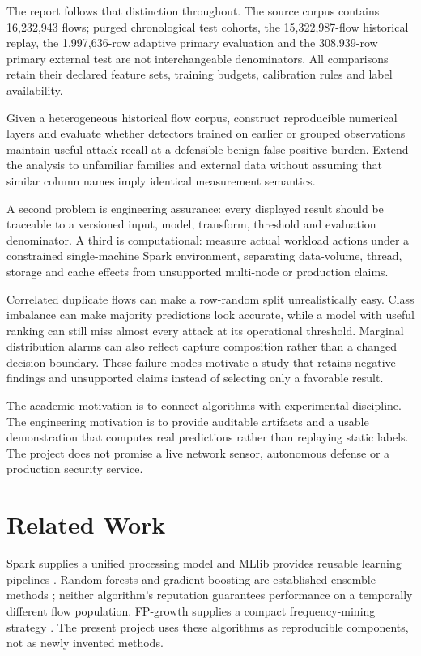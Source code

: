 \documentclass[conference]{IEEEtran}
\begin{document}
The report follows that distinction throughout. The source corpus contains 16,232,943 flows; purged chronological test cohorts, the 15,322,987-flow historical replay, the 1,997,636-row adaptive primary evaluation and the 308,939-row primary external test are not interchangeable denominators. All comparisons retain their declared feature sets, training budgets, calibration rules and label availability.

Given a heterogeneous historical flow corpus, construct reproducible numerical layers and evaluate whether detectors trained on earlier or grouped observations maintain useful attack recall at a defensible benign false-positive burden. Extend the analysis to unfamiliar families and external data without assuming that similar column names imply identical measurement semantics.

A second problem is engineering assurance: every displayed result should be traceable to a versioned input, model, transform, threshold and evaluation denominator. A third is computational: measure actual workload actions under a constrained single-machine Spark environment, separating data-volume, thread, storage and cache effects from unsupported multi-node or production claims.

Correlated duplicate flows can make a row-random split unrealistically easy. Class imbalance can make majority predictions look accurate, while a model with useful ranking can still miss almost every attack at its operational threshold. Marginal distribution alarms can also reflect capture composition rather than a changed decision boundary. These failure modes motivate a study that retains negative findings and unsupported claims instead of selecting only a favorable result.

The academic motivation is to connect algorithms with experimental discipline. The engineering motivation is to provide auditable artifacts and a usable demonstration that computes real predictions rather than replaying static labels. The project does not promise a live network sensor, autonomous defense or a production security service.

\section{Related Work}
Spark supplies a unified processing model and MLlib provides reusable learning pipelines \cite{spark,mllib}. Random forests and gradient boosting are established ensemble methods \cite{forest,boosting}; neither algorithm's reputation guarantees performance on a temporally different flow population. FP-growth supplies a compact frequency-mining strategy \cite{fpgrowth}. The present project uses these algorithms as reproducible components, not as newly invented methods.
\end{document}
